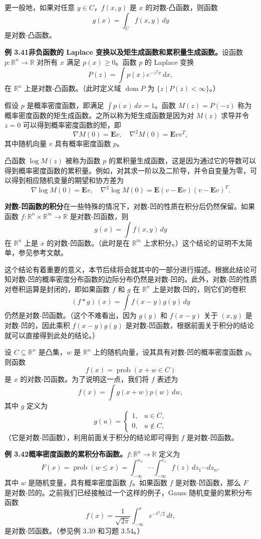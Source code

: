 \documentclass[UTF8, 12pt, fontset=fandol, oneside]{ctexart}
\DeclareMathOperator{\dom}{dom}
\begin{document}
更一般地，如果对任意 $y\in C$，$f(x,y)$ 是 $x$ 的对数-凸函数，则函数
\[
g(x)=\int_C f(x,y)\,dy
\]
是对数-凸函数。

\noindent\textbf{例 3.41\quad 非负函数的 Laplace 变换以及矩生成函数和累积量生成函数。}\quad 设函数 $p:\mathbb{R}^n\to\mathbb{R}$ 对所有 $x$ 满足 $p(x)\geq0$。函数 $p$ 的 Laplace 变换
\[
P(z)=\int p(x)e^{-z^Tx}\,dx,
\]
在 $\mathbb{R}^n$ 上是对数-凸函数。（此时定义域 $\dom P$ 为 $\{z\mid P(z)<\infty\}$。）

假设 $p$ 是概率密度函数，即满足 $\int p(x)\,dx=1$。函数 $M(z)=P(-z)$ 称为概率密度函数的矩生成函数。之所以称为矩生成函数是因为对 $M(z)$ 求导并令 $z=0$ 可以得到概率密度函数的矩，即
\[
\nabla M(0)=\mathbf{E}v,\quad
\nabla^2M(0)=\mathbf{E}vv^T,
\]
其中随机向量 $v$ 具有概率密度函数 $p$。

凸函数 $\log M(z)$ 被称为函数 $p$ 的累积量生成函数，这是因为通过它的导数可以得到概率密度函数的累积量。例如，对其求一阶以及二阶导，并令自变量为零，可以得到相应随机变量的期望和协方差为
\[
\nabla\log M(0)=\mathbf{E}v,\quad
\nabla^2\log M(0)=\mathbf{E}(v-\mathbf{E}v)(v-\mathbf{E}v)^T.
\]

\noindent\textbf{对数-凹函数的积分}\quad 在一些特殊的情况下，对数-凹的性质在积分后仍然保留。如果函数 $f:\mathbb{R}^n\times\mathbb{R}^m\to\mathbb{R}$ 是对数-凹函数，则
\[
g(x)=\int f(x,y)\,dy
\]
在 $\mathbb{R}^n$ 上是 $x$ 的对数-凹函数。（此时是在 $\mathbb{R}^m$ 上求积分。）这个结论的证明不太简单，参见参考文献。

这个结论有着重要的意义，本节后续将会就其中的一部分进行描述。根据此结论可知对数-凹的概率密度分布函数的边际分布仍然是对数-凹的。此外，对数-凹的性质对卷积运算是封闭的，即如果函数 $f$ 和 $g$ 在 $\mathbb{R}^n$ 上是对数-凹的，则它们的卷积
\[
(f*g)(x)=\int f(x-y)g(y)\,dy
\]
仍然是对数-凹函数。（这个不难看出，因为 $g(y)$ 和 $f(x-y)$ 关于 $(x,y)$ 是对数-凹的，因此乘积 $f(x-y)g(y)$ 是对数-凹函数，根据前面关于积分的结论就可以直接得到此处的结论。）

设 $C\subseteq\mathbb{R}^n$ 是凸集，$w$ 是 $\mathbb{R}^n$ 上的随机向量，设其具有对数-凹的概率密度函数 $p$。则函数
\[
f(x)=\operatorname{prob}(x+w\in C)
\]
是 $x$ 的对数-凹函数。为了说明这一点，我们将 $f$ 表述为
\[
f(x)=\int g(x+w)p(w)\,dw,
\]
其中 $g$ 定义为
\[
g(u)=
\begin{cases}
1, & u\in C,\\
0, & u\notin C,
\end{cases}
\]
（它是对数-凹函数），利用前面关于积分的结论即可得到 $f$ 是对数-凹函数。

\noindent\textbf{例 3.42\quad 概率密度函数的累积分布函数。}\quad $f:\mathbb{R}^n\to\mathbb{R}$ 定义为
\[
F(x)=\operatorname{prob}(w\leq x)=\int_{-\infty}^{x_n}\cdots\int_{-\infty}^{x_1} f(z)\,dz_1\cdots dz_n,
\]
其中 $w$ 是随机变量，具有概率密度函数 $f$。如果函数 $f$ 是对数-凹函数，那么 $F$ 是对数-凹的。之前我们已经接触过一个这样的例子，Gauss 随机变量的累积分布函数
\[
f(x)=\frac{1}{\sqrt{2\pi}}\int_{-\infty}^{x}e^{-t^2/2}\,dt,
\]
是对数-凹函数。（参见例 3.39 和习题 3.54。）
\end{document}
